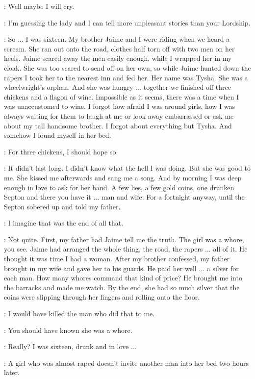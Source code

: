 \SHAE: Well maybe I will cry. 

\BRONN: I'm guessing the lady and I can tell more unpleasant stories than your Lordship. 

\TYRION: So $\ldots$ I was sixteen. My brother Jaime and I were riding when we heard a scream. She ran out onto the road, clothes half torn off with two men on her heels. Jaime scared away the men easily enough, while I wrapped her in my cloak. She was too scared to send off on her own, so while Jaime hunted down the rapers I took her to the nearest inn and fed her. Her name was Tysha. She was a wheelwright's orphan. And she was hungry $\ldots$ together we finished off three chickens and a flagon of wine. Impossible as it seems, there was a time when I was unaccustomed to wine. I forgot how afraid I was around girls, how I was always waiting for them to laugh at me or look away embarrassed or ask me about my tall handsome brother. I forgot about everything but Tysha. And somehow I found myself in her bed. 

\BRONN: For three chickens, I should hope so. 

\TYRION: It didn't last long. I didn't know what the hell I was doing. But she was good to me. She kissed me afterwards and sang me a song. And by morning I was deep enough in love to ask for her hand. A few lies, a few gold coins, one drunken Septon and there you have it $\ldots$ man and wife. For a fortnight anyway, until the Septon sobered up and told my father. 

\BRONN: I imagine that was the end of all that. 

\TYRION: Not quite. First, my father had Jaime tell me the truth. The girl was a whore, you see. Jaime had arranged the whole thing, the road, the rapers $\ldots$ all of it. He thought it was time I had a woman. After my brother confessed, my father brought in my wife and gave her to his guards. He paid her well $\ldots$  a silver for each man. How many whores command that kind of price? He brought me into the barracks and made me watch. By the end, she had so much silver that the coins were slipping through her fingers and rolling onto the floor. 

\BRONN: I would have killed the man who did that to me. 

\SHAE: You should have known she was a whore. 

\TYRION: Really? I was sixteen, drunk and in love $\ldots$  

\SHAE: A girl who was almost raped doesn't invite another man into her bed two hours later. 

